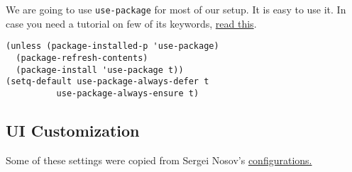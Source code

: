 \documentclass[11pt]{article}
\begin{document}
We are going to use \texttt{use-package} for most of our setup. It is easy to use it. In case you need a tutorial on few of its keywords, \href{https://jwiegley.github.io/use-package/keywords/\#preface-init-config}{read this}.

\begin{verbatim}
(unless (package-installed-p 'use-package)
  (package-refresh-contents)
  (package-install 'use-package t))
(setq-default use-package-always-defer t
	      use-package-always-ensure t)
\end{verbatim}

\subsection{UI Customization}
\label{sec:org9c12f67}

Some of these settings were copied from Sergei Nosov's \href{https://github.com/snosov1/dot-emacs\#ui-customization}{configurations.}
\end{document}
